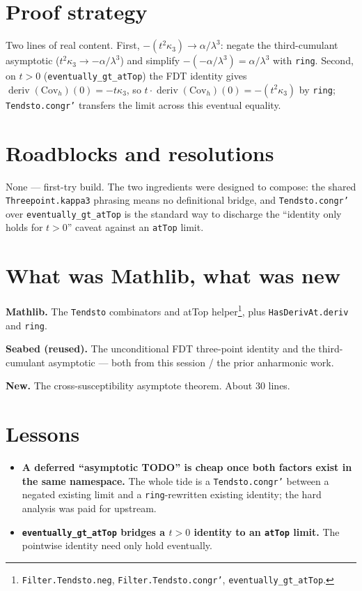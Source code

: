 \documentclass[11pt]{article}
\newcommand{\deriv}{\operatorname{deriv}}
\begin{document}
\section{Proof strategy}

Two lines of real content. First, $-(t^2\kappa_3)\to\alpha/\lambda^3$: negate
the third-cumulant asymptotic ($t^2\kappa_3\to-\alpha/\lambda^3$) and simplify
$-(-\alpha/\lambda^3)=\alpha/\lambda^3$ with \texttt{ring}. Second, on $t>0$
(\texttt{eventually\_gt\_atTop}) the FDT identity gives
$\deriv(\mathrm{Cov}_h)(0)=-t\kappa_3$, so $t\cdot\deriv(\mathrm{Cov}_h)(0)=
-(t^2\kappa_3)$ by \texttt{ring}; \texttt{Tendsto.congr'} transfers the limit
across this eventual equality.

\section{Roadblocks and resolutions}

None --- first-try build. The two ingredients were designed to compose: the
shared \texttt{Threepoint.kappa3} phrasing means no definitional bridge, and
\texttt{Tendsto.congr'} over \texttt{eventually\_gt\_atTop} is the standard way
to discharge the ``identity only holds for $t>0$'' caveat against an
\texttt{atTop} limit.

\section{What was Mathlib, what was new}

\textbf{Mathlib.} The \texttt{Tendsto} combinators and atTop
helper\footnote{\texttt{Filter.Tendsto.neg}, \texttt{Filter.Tendsto.congr'},
\texttt{eventually\_gt\_atTop}.}, plus \texttt{HasDerivAt.deriv} and
\texttt{ring}.

\textbf{Seabed (reused).} The unconditional FDT three-point identity and the
third-cumulant asymptotic --- both from this session / the prior anharmonic
work.

\textbf{New.} The cross-susceptibility asymptote theorem. About 30 lines.

\section{Lessons}

\begin{itemize}[itemsep=3pt]
\item \textbf{A deferred ``asymptotic TODO'' is cheap once both factors exist in
  the same namespace.} The whole tide is a \texttt{Tendsto.congr'} between a
  negated existing limit and a \texttt{ring}-rewritten existing identity; the
  hard analysis was paid for upstream.
\item \textbf{\texttt{eventually\_gt\_atTop} bridges a $t>0$ identity to an
  \texttt{atTop} limit.} The pointwise identity need only hold eventually.
\end{itemize}
\end{document}
